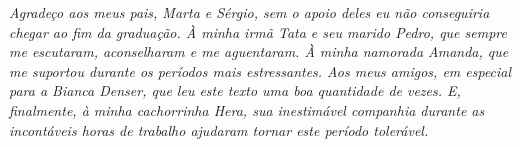 \emph{Agradeço aos meus pais, Marta e Sérgio, sem o apoio deles eu não conseguiria chegar ao fim da graduação.
À minha irmã Tata e seu marido Pedro, que sempre me escutaram, aconselharam e me aguentaram.
À minha namorada Amanda, que me suportou durante os períodos mais estressantes.
Aos meus amigos, em especial para a Bianca Denser, que leu este texto uma boa quantidade de vezes.
E, finalmente, à minha cachorrinha Hera, sua inestimável companhia durante as incontáveis horas de trabalho
ajudaram tornar este período tolerável.}
